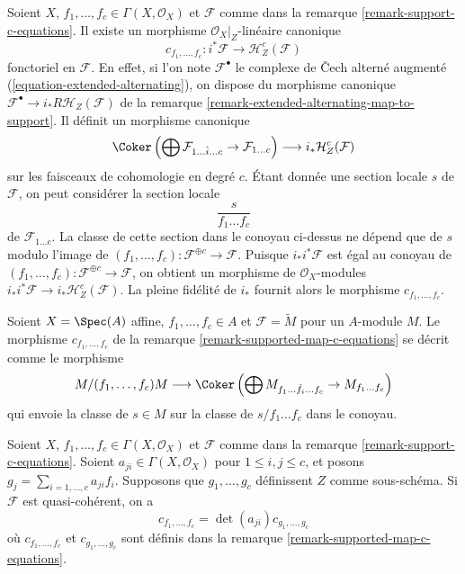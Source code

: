 \begin{remark}
\label{remark-supported-map-c-equations}
Soient $X$, $f_1, \ldots, f_c \in \Gamma(X, \mathcal{O}_X)$ et
$\mathcal{F}$ comme dans la remarque \ref{remark-support-c-equations}.
Il existe un morphisme $\mathcal{O}_X|_Z$-linéaire canonique
$$
c_{f_1, \ldots, f_c} :
i^*\mathcal{F}
\longrightarrow
\mathcal{H}^c_Z(\mathcal{F})
$$
fonctoriel en $\mathcal{F}$. En effet, si l'on note $\mathcal{F}^\bullet$ le
complexe de {\v C}ech alterné augmenté (\ref{equation-extended-alternating}),
on dispose du morphisme canonique
$\mathcal{F}^\bullet \to i_*R\mathcal{H}_Z(\mathcal{F})$
de la remarque \ref{remark-extended-alternating-map-to-support}.
Il définit un morphisme canonique
$$
\Coker\left(\bigoplus \mathcal{F}_{1 \ldots \hat i \ldots c} \to
\mathcal{F}_{1 \ldots c}\right)
\longrightarrow
i_*\mathcal{H}^c_Z(\mathcal{F})
$$
sur les faisceaux de cohomologie en degré $c$.
Étant donnée une section locale $s$ de $\mathcal{F}$, on peut considérer la
section locale
$$
\frac{s}{f_1 \ldots f_c}
$$
de $\mathcal{F}_{1 \ldots c}$. La classe de cette section dans le conoyau
ci-dessus ne dépend que de $s$ modulo l'image de
$(f_1, \ldots, f_c) : \mathcal{F}^{\oplus c} \to \mathcal{F}$.
Puisque $i_*i^*\mathcal{F}$ est égal au conoyau de
$(f_1, \ldots, f_c) : \mathcal{F}^{\oplus c} \to \mathcal{F}$,
on obtient un morphisme de $\mathcal{O}_X$-modules
$i_*i^*\mathcal{F} \to i_*\mathcal{H}_Z^c(\mathcal{F})$.
La pleine fidélité de $i_*$ fournit alors le morphisme $c_{f_1, \ldots, f_c}$.
\end{remark}

\begin{example}
\label{example-affine-supported-map-c-equations}
Soient $X = \Spec(A)$ affine, $f_1, \ldots, f_c \in A$ et
$\mathcal{F} = \widetilde{M}$ pour un $A$-module $M$. Le morphisme
$c_{f_1, \ldots, f_c}$ de la remarque \ref{remark-supported-map-c-equations}
se décrit comme le morphisme
$$
M/(f_1, \ldots, f_c)M
\longrightarrow
\Coker\left(
\bigoplus M_{f_1 \ldots \hat f_i \ldots f_c} \to M_{f_1 \ldots f_c}
\right)
$$
qui envoie la classe de $s \in M$ sur la classe de $s/f_1 \ldots f_c$
dans le conoyau.
\end{example}

\begin{lemma}
\label{lemma-supported-map-determinant}
Soient $X$, $f_1, \ldots, f_c \in \Gamma(X, \mathcal{O}_X)$ et
$\mathcal{F}$ comme dans la remarque \ref{remark-support-c-equations}.
Soient $a_{ji} \in \Gamma(X, \mathcal{O}_X)$ pour $1 \leq i, j \leq c$,
et posons $g_j = \sum_{i = 1, \ldots, c} a_{ji}f_i$. Supposons que $g_1, \ldots, g_c$
définissent $Z$ comme sous-schéma. Si $\mathcal{F}$ est quasi-cohérent, on a
$$
c_{f_1, \ldots, f_c} = \det(a_{ji}) c_{g_1, \ldots, g_c}
$$
où $c_{f_1, \ldots, f_c}$ et $c_{g_1, \ldots, g_c}$ sont définis dans la
remarque \ref{remark-supported-map-c-equations}.
\end{lemma}

